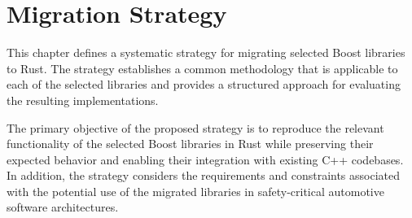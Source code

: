 \chapter{Migration Strategy}
\label{chap:Chapter4}

This chapter defines a systematic strategy for migrating selected Boost libraries to Rust.
The strategy establishes a common methodology that is applicable to each of the selected libraries and provides
a structured approach for evaluating the resulting implementations.

The primary objective of the proposed strategy is to reproduce the relevant functionality of the selected Boost libraries in Rust 
while preserving their expected behavior and enabling their integration with existing C++ codebases. In addition, the strategy 
considers the requirements and constraints associated with the potential use of the migrated libraries in safety-critical 
automotive software architectures.

